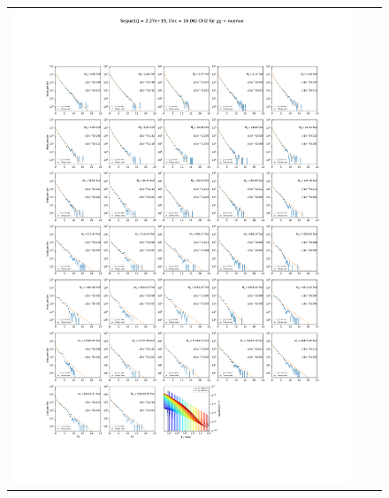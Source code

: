 \begin{figure}[!hb]
{\begin{tabular}{ccc}
            \includegraphics[clip, trim=22.1cm 6.5cm 19.5cm 56.5cm, scale=0.55]{figures/ic_DM/dm_plots/Segue1_nuenue_chi2_Masspanel_2024-04-28.pdf} &

\end{tabular}}
\end{figure}
